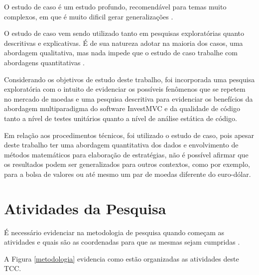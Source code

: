 O estudo de caso é um estudo profundo, recomendável para temas muito complexos, em que é muito dificil gerar generalizações \cite[pág.~33]{fonseca2002}.

O estudo de caso vem sendo utilizado tanto em pesquisas exploratórias quanto descritivas e explicativas. É de sua natureza adotar na maioria dos casos, uma abordagem qualitativa, mas nada impede que o estudo de caso trabalhe com abordagens quantitativas \cite[pág.~22]{yin}.

Considerando os objetivos de estudo deste trabalho, foi incorporada uma pesquisa exploratória com o intuito de evidenciar os possíveis fenômenos que se repetem no mercado de moedas e uma pesquisa descritiva para evidenciar os benefícios da abordagem multiparadigma do software InvestMVC e da qualidade de código tanto a nível de testes unitários quanto a nível de análise estática de código.

Em relação aos procedimentos técnicos, foi utilizado o estudo de caso, pois apesar deste trabalho ter uma abordagem quantitativa dos dados e envolvimento de métodos matemáticos para elaboração de estratégias, não é possível afirmar que os resultados podem ser generalizados para outros contextos, como por exemplo, para a bolsa de valores ou até mesmo um par de moedas diferente do euro-dólar.

\section{Atividades da Pesquisa}

É necessário evidenciar na metodologia de pesquisa quando começam as atividades e quais são as coordenadas para que as mesmas sejam cumpridas \cite{forcon2014}.

A Figura \ref{metodologia} evidencia como estão organizadas as atividades deste TCC.

